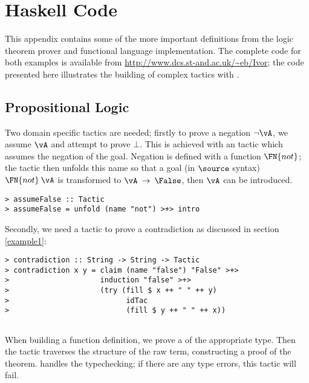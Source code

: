 \section{Haskell Code}

This appendix contains some of the more important definitions from the
logic theorem prover and functional language implementation. The
complete code for both examples is available from
\url{http://www.dcs.st-and.ac.uk/~eb/Ivor}; the code presented here
illustrates the building of complex tactics with \Ivor{}.

\subsection{Propositional Logic}

Two domain specific tactics are needed; firstly to prove a negation
$\neg\vA$, we assume $\vA$ and attempt to prove $\bot$. This is
achieved with an  tactic which assumes the negation
of the goal. Negation is defined with a function $\FN{not}$; the
 tactic then unfolds this name so that a goal (in
$\source$ syntax) $\FN{not}\:\vA$ is transformed to
$\vA\:\to\:\False$, then $\vA$ can be introduced.

\begin{verbatim}
> assumeFalse :: Tactic
> assumeFalse = unfold (name "not") >+> intro 
\end{verbatim}

Secondly, we need a tactic to prove a contradiction as discussed in
section \ref{example1}:

\begin{verbatim}
> contradiction :: String -> String -> Tactic
> contradiction x y = claim (name "false") "False" >+>
>                     induction "false" >+>
>                     (try (fill $ x ++ " " ++ y)
>                           idTac
>                           (fill $ y ++ " " ++ x))
\end{verbatim}

\subsection{\Funl{}}

\label{funlapp}

When building a function definition, we prove a  of the
appropriate type. Then the  tactic traverses the
structure of the raw term, constructing a proof of the
theorem. \Ivor{} handles the typechecking; if there are any type
errors, this tactic will fail.

